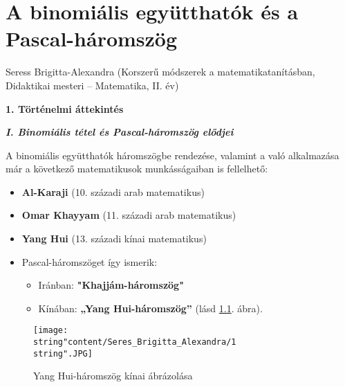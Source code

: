 
\chapter{A binomiális együtthatók és a Pascal-háromszög}\label{chap:Pascal}
\begin{description}
	{\large \item [{Szerző:}] Seress Brigitta-Alexandra (Korszerű módszerek a matematikatanításban, Didaktikai mesteri -- Matematika, 
	II. év)}
\end{description}
\vspace{0.5cm}


\textbf{1. Történelmi áttekintés}

\vspace{0.3cm}

\textbf{\textit{I. Binomiális tétel és Pascal-háromszög elődjei}}

A \textcolor{ccqqqq}{binomiális együtthatók háromszögbe rendezése},
valamint a {\color{ccqqqq}{binomiális tétel kisebb pozitív egész
kitevőkre}} való alkalmazása már a következő matematikusok munkásságaiban
is fellelhető: 
\begin{itemize}
\item \textbf{Al-Karaji} (10. századi arab matematikus) 
\item \textbf{Omar Khayyam} (11. századi arab matematikus) 
\item \textbf{Yang Hui} (13. századi kínai matematikus) 
\item Pascal-háromszöget így ismerik: 
\begin{itemize}
\item Iránban: \textbf{"Khajjám-háromszög"} 
\item Kínában: \textbf{„Yang Hui-háromszög”} (lásd \ref{7sb1}. ábra). 
\end{itemize}
\end{itemize}
\begin{figure}[h]
\centering \texttt{[image: \\string"content/Seres\_Brigitta\_Alexandra/1\\string".JPG]}
\caption{Yang Hui-háromszög kínai ábrázolása}
\label{7sb1} 
\end{figure}

\vspace{0.3cm}

